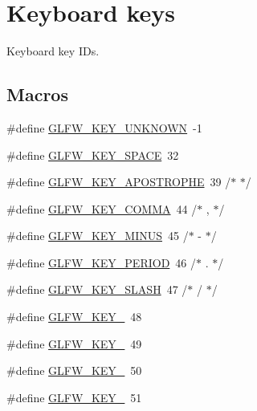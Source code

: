 \hypertarget{group__keys}{}\section{Keyboard keys}
\label{group__keys}


Keyboard key I\+Ds.  


\subsection*{Macros}
\begin{DoxyCompactItemize}
\item 
\#define \mbox{\hyperlink{group__keys_ga99aacc875b6b27a072552631e13775c7}{G\+L\+F\+W\+\_\+\+K\+E\+Y\+\_\+\+U\+N\+K\+N\+O\+WN}}~-\/1
\item 
\#define \mbox{\hyperlink{group__keys_gaddb2c23772b97fd7e26e8ee66f1ad014}{G\+L\+F\+W\+\_\+\+K\+E\+Y\+\_\+\+S\+P\+A\+CE}}~32
\item 
\#define \mbox{\hyperlink{group__keys_ga6059b0b048ba6980b6107fffbd3b4b24}{G\+L\+F\+W\+\_\+\+K\+E\+Y\+\_\+\+A\+P\+O\+S\+T\+R\+O\+P\+HE}}~39  /$\ast$ \textquotesingle{} $\ast$/
\item 
\#define \mbox{\hyperlink{group__keys_gab3d5d72e59d3055f494627b0a524926c}{G\+L\+F\+W\+\_\+\+K\+E\+Y\+\_\+\+C\+O\+M\+MA}}~44  /$\ast$ , $\ast$/
\item 
\#define \mbox{\hyperlink{group__keys_gac556b360f7f6fca4b70ba0aecf313fd4}{G\+L\+F\+W\+\_\+\+K\+E\+Y\+\_\+\+M\+I\+N\+US}}~45  /$\ast$ -\/ $\ast$/
\item 
\#define \mbox{\hyperlink{group__keys_ga37e296b650eab419fc474ff69033d927}{G\+L\+F\+W\+\_\+\+K\+E\+Y\+\_\+\+P\+E\+R\+I\+OD}}~46  /$\ast$ . $\ast$/
\item 
\#define \mbox{\hyperlink{group__keys_gadf3d753b2d479148d711de34b83fd0db}{G\+L\+F\+W\+\_\+\+K\+E\+Y\+\_\+\+S\+L\+A\+SH}}~47  /$\ast$ / $\ast$/
\item 
\#define \mbox{\hyperlink{group__keys_ga50391730e9d7112ad4fd42d0bd1597c1}{G\+L\+F\+W\+\_\+\+K\+E\+Y\+\_}}~48
\item 
\#define \mbox{\hyperlink{group__keys_ga05e4cae9ddb8d40cf6d82c8f11f2502f}{G\+L\+F\+W\+\_\+\+K\+E\+Y\+\_}}~49
\item 
\#define \mbox{\hyperlink{group__keys_gadc8e66b3a4c4b5c39ad1305cf852863c}{G\+L\+F\+W\+\_\+\+K\+E\+Y\+\_}}~50
\item 
\#define \mbox{\hyperlink{group__keys_ga812f0273fe1a981e1fa002ae73e92271}{G\+L\+F\+W\+\_\+\+K\+E\+Y\+\_}}~51
\item 

\end{DoxyCompactItemize}
